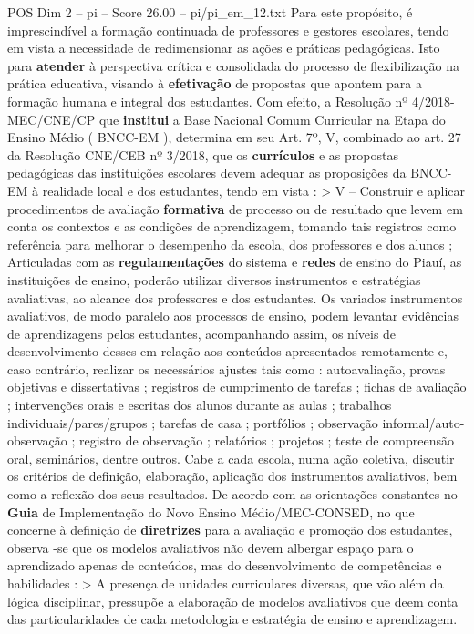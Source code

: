 \begin{textsample}{POS Dim 2 – pi – Score 26.00 – pi/pi\_em\_12.txt}
Para este propósito, é imprescindível a formação continuada de professores e gestores escolares, tendo em vista a necessidade de redimensionar as ações e práticas pedagógicas.
Isto para \textbf{atender} à perspectiva crítica e consolidada do processo de flexibilização na prática educativa, visando à \textbf{efetivação} de propostas que apontem para a formação humana e integral dos estudantes.
Com efeito, a Resolução nº 4/2018-MEC/CNE/CP que \textbf{institui} a Base Nacional Comum Curricular na Etapa do Ensino Médio ( BNCC-EM ), determina em seu Art. 7º, V, combinado ao art. 27 da Resolução CNE/CEB nº 3/2018, que os \textbf{currículos} e as propostas pedagógicas das instituições escolares devem adequar as proposições da BNCC-EM à realidade local e dos estudantes, tendo em vista : > V – Construir e aplicar procedimentos de avaliação \textbf{formativa} de processo ou de resultado que levem em conta os contextos e as condições de aprendizagem, tomando tais registros como referência para melhorar o desempenho da escola, dos professores e dos alunos ; Articuladas com as \textbf{regulamentações} do sistema e \textbf{redes} de ensino do Piauí, as instituições de ensino, poderão utilizar diversos instrumentos e estratégias avaliativas, ao alcance dos professores e dos estudantes.
Os variados instrumentos avaliativos, de modo paralelo aos processos de ensino, podem levantar evidências de aprendizagens pelos estudantes, acompanhando assim, os níveis de desenvolvimento desses em relação aos conteúdos apresentados remotamente e, caso contrário, realizar os necessários ajustes tais como : autoavaliação, provas objetivas e dissertativas ; registros de cumprimento de tarefas ; fichas de avaliação ; intervenções orais e escritas dos alunos durante as aulas ; trabalhos individuais/pares/grupos ; tarefas de casa ; portfólios ; observação informal/auto-observação ; registro de observação ; relatórios ; projetos ; teste de compreensão oral, seminários, dentre outros.
Cabe a cada escola, numa ação coletiva, discutir os critérios de definição, elaboração, aplicação dos instrumentos avaliativos, bem como a reflexão dos seus resultados.
De acordo com as orientações constantes no \textbf{Guia} de Implementação do Novo Ensino Médio/MEC-CONSED, no que concerne à definição de \textbf{diretrizes} para a avaliação e promoção dos estudantes, observa -se que os modelos avaliativos não devem albergar espaço para o aprendizado apenas de conteúdos, mas do desenvolvimento de competências e habilidades : > A presença de unidades curriculares diversas, que vão além da lógica disciplinar, pressupõe a elaboração de modelos avaliativos que deem conta das particularidades de cada metodologia e estratégia de ensino e aprendizagem.

\end{textsample}
